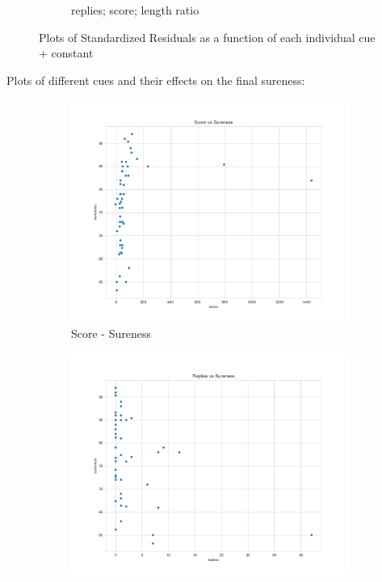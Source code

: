 \documentclass[11pt, oneside]{article}   	%
\begin{document}
\begin{figure}[H]
\begin{subfigure}{.5\textwidth}
  \caption{replies; score; length ratio}
\end{subfigure}
\caption{Plots of Standardized Residuals as a function of each individual cue + constant}
\end{figure}

Plots of different cues and their effects on the final sureness:
\begin{figure}[H]
\centering
\begin{subfigure}{.5\textwidth}
  \centering
  \includegraphics[width=\linewidth]{../plots/full_data/score_vs_sureness}
  \caption{Score - Sureness}
\end{subfigure}%
\begin{subfigure}{.5\textwidth}
  \centering
  \includegraphics[width=\linewidth]{../plots/full_data/replies_vs_sureness}

\end{subfigure}
\end{figure}
\end{document}
